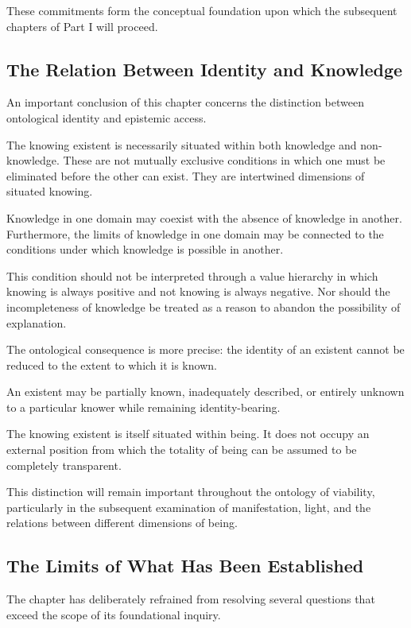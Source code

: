These commitments form the conceptual foundation upon which the subsequent chapters of Part I will proceed.

\subsection{The Relation Between Identity and Knowledge}

An important conclusion of this chapter concerns the distinction between ontological identity and epistemic access.

The knowing existent is necessarily situated within both knowledge and non-knowledge. These are not mutually exclusive conditions in which one must be eliminated before the other can exist. They are intertwined dimensions of situated knowing.

Knowledge in one domain may coexist with the absence of knowledge in another. Furthermore, the limits of knowledge in one domain may be connected to the conditions under which knowledge is possible in another.

This condition should not be interpreted through a value hierarchy in which knowing is always positive and not knowing is always negative. Nor should the incompleteness of knowledge be treated as a reason to abandon the possibility of explanation.

The ontological consequence is more precise: the identity of an existent cannot be reduced to the extent to which it is known.

An existent may be partially known, inadequately described, or entirely unknown to a particular knower while remaining identity-bearing.

The knowing existent is itself situated within being. It does not occupy an external position from which the totality of being can be assumed to be completely transparent.

This distinction will remain important throughout the ontology of viability, particularly in the subsequent examination of manifestation, light, and the relations between different dimensions of being.

\subsection{The Limits of What Has Been Established}

The chapter has deliberately refrained from resolving several questions that exceed the scope of its foundational inquiry.


